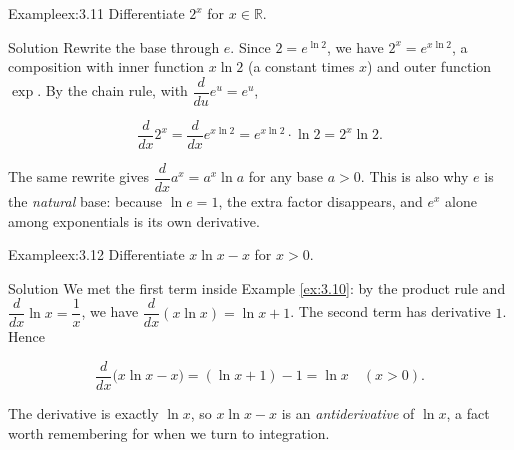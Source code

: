 \documentclass[a4paper,12pt,oneside]{memoir}
\begin{document}
\begin{workedexample}
\begin{envexample}{Example}{ex:3.11}{}
Differentiate \(2^{x}\) for \(x \in \mathbb{R}\).
\end{envexample}
\begin{envsolution}{Solution}{}{}
Rewrite the base through \(e\). Since \(2 = e^{\ln 2}\), we have \(2^{x} = e^{x\ln 2}\), a composition with inner function \(x\ln 2\) (a constant times \(x\)) and outer function \(\exp\). By the chain rule, with \(\dfrac{d}{du}e^{u} = e^{u}\),

\[ \frac{d}{dx}2^{x} = \frac{d}{dx}e^{x\ln 2} = e^{x\ln 2}\cdot\ln 2 = 2^{x}\ln 2. \]

The same rewrite gives \(\dfrac{d}{dx}a^{x} = a^{x}\ln a\) for any base \(a > 0\). This is also why \(e\) is the \emph{natural} base: because \(\ln e = 1\), the extra factor disappears, and \(e^{x}\) alone among exponentials is its own derivative.
\end{envsolution}
\end{workedexample}
\begin{workedexample}
\begin{envexample}{Example}{ex:3.12}{}
Differentiate \(x\ln x - x\) for \(x > 0\).
\end{envexample}
\begin{envsolution}{Solution}{}{}
We met the first term inside Example \ref{ex:3.10}: by the product rule and \(\dfrac{d}{dx}\ln x = \dfrac{1}{x}\), we have \(\dfrac{d}{dx}(x\ln x) = \ln x + 1\). The second term has derivative \(1\). Hence

\[ \frac{d}{dx}\bigl(x\ln x - x\bigr) = (\ln x + 1) - 1 = \ln x \quad (x > 0). \]

The derivative is exactly \(\ln x\), so \(x\ln x - x\) is an \emph{antiderivative} of \(\ln x\), a fact worth remembering for when we turn to integration.
\end{envsolution}
\end{workedexample}
\end{document}
